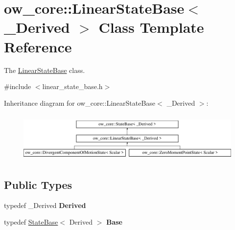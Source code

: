 \hypertarget{classow__core_1_1LinearStateBase}{}\section{ow\+\_\+core\+:\+:Linear\+State\+Base$<$ \+\_\+\+Derived $>$ Class Template Reference}
\label{classow__core_1_1LinearStateBase}


The \hyperlink{classow__core_1_1LinearStateBase}{Linear\+State\+Base} class.  




{\ttfamily \#include $<$linear\+\_\+state\+\_\+base.\+h$>$}

Inheritance diagram for ow\+\_\+core\+:\+:Linear\+State\+Base$<$ \+\_\+\+Derived $>$\+:\begin{figure}[H]
\begin{center}
\leavevmode
\includegraphics[height=2.514970cm]{d3/d15/classow__core_1_1LinearStateBase}
\end{center}
\end{figure}
\subsection*{Public Types}
\begin{DoxyCompactItemize}
\item 
typedef \+\_\+\+Derived {\bfseries Derived}\hypertarget{classow__core_1_1LinearStateBase_a5033d6d34eac820163fcff2ddc6b36a1}{}\label{classow__core_1_1LinearStateBase_a5033d6d34eac820163fcff2ddc6b36a1}

\item 
typedef \hyperlink{classow__core_1_1StateBase}{State\+Base}$<$ Derived $>$ {\bfseries Base}\hypertarget{classow__core_1_1LinearStateBase_a84faf95ab40e723063bb5df09686bf33}{}\label{classow__core_1_1LinearStateBase_a84faf95ab40e723063bb5df09686bf33}

\end{DoxyCompactItemize}
